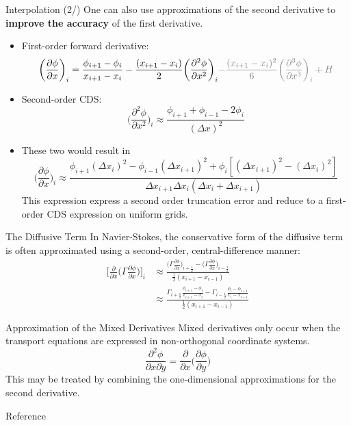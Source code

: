 \documentclass[10pt,aspectratio=169]{beamer}
\begin{document}
\begin{frame}{Interpolation (2/)}
One can also use approximations of the second derivative to \textbf{improve the accuracy} of the first derivative.
\begin{itemize}
    \item First-order forward derivative: 
    \[ 
    \bigg(\frac{\partial \phi}{\partial x}\bigg)_{i} = 
    \frac{\phi_{i+1}-\phi_{i}}{x_{i+1}-x_{i}}
    - \frac{(x_{i+1}-x_{i})}{2}\bigg(\frac{\partial^{2} \phi}{\partial x^{2}}\bigg)_{i}
    {\color{gray}-\frac{(x_{i+1}-x_{i})^{2}}{6}\bigg(\frac{\partial^{3} \phi}{\partial x^{3}}\bigg)_{i} + H}
    \]
    \item Second-order CDS:
    \[
    \bigg( \frac{\partial^{2}\phi}{\partial x^{2}} \bigg)_{i} \approx
    \frac{\phi_{i+1} + \phi_{i-1} -2\phi_{i}}{(\Delta x)^{2}}
    \]
    \item These two would result in
    \[
    \bigg(\frac{\partial \phi}{\partial x}\bigg)_{i} \approx \frac{\phi_{i+1}(\Delta x_{i})^{2} - \phi_{i-1}(\Delta x_{i+1})^{2} + \phi_{i}[(\Delta x_{i+1})^{2}-(\Delta x_{i})^{2}]}{\Delta x_{i+1}\Delta x_{i} (\Delta x_{i}+\Delta x_{i+1})}
    \]
    This expression express a second order truncation error and reduce to a first-order CDS expression on uniform grids.
\end{itemize}
\end{frame}
\begin{frame}{The Diffusive Term}
In Navier-Stokes, the conservative form of the diffusive term is often approximated using a second-order, central-difference manner:
\begin{align*}
    \bigg[\frac{\partial}{\partial x} \bigg(\Gamma \frac{\partial \phi}{\partial x} \bigg)\bigg]_{i} & \approx
    \frac{\bigg( \Gamma \frac{\partial\phi}{\partial x} \bigg)_{i+\frac{1}{2}} - \bigg( \Gamma \frac{\partial\phi}{\partial x} \bigg)_{i-\frac{1}{2}}}{\frac{1}{2}(x_{i+1}-x_{i-1})} \\
    & \approx \frac{\Gamma_{i+\frac{1}{2}}\frac{\phi_{i+1}-\phi_{i}}{x_{i+1}-x_{i}} - \Gamma_{i-\frac{1}{2}}\frac{\phi_{i}-\phi_{i-1}}{x_{i}-x_{i-1}}}{\frac{1}{2}(x_{i+1}-x_{i-1})}
\end{align*}
\end{frame}
\begin{frame}{Approximation of the Mixed Derivatives}
Mixed derivatives only occur when the transport equations are expressed in non-orthogonal coordinate systems.
    \[
    \frac{\partial^{2} \phi}{\partial x \partial y} = \frac{\partial}{\partial x} \bigg( \frac{\partial \phi}{\partial y} \bigg)
    \]
This may be treated by combining the one-dimensional approximations for the second derivative.
\end{frame}
\appendix
\begin{frame}{Reference}
 
 
\end{frame}
\end{document}
